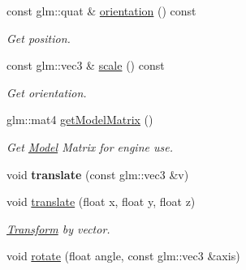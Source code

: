 \begin{DoxyCompactItemize}
\item 
\hypertarget{class_transform_component_a97463125a89912585d1facfc5e383765}{const glm\+::quat \& \hyperlink{class_transform_component_a97463125a89912585d1facfc5e383765}{orientation} () const }\label{class_transform_component_a97463125a89912585d1facfc5e383765}

\begin{DoxyCompactList}\small\item\em Get position. \end{DoxyCompactList}\item 
\hypertarget{class_transform_component_a759c702f0602108614a0a00503c2320a}{const glm\+::vec3 \& \hyperlink{class_transform_component_a759c702f0602108614a0a00503c2320a}{scale} () const }\label{class_transform_component_a759c702f0602108614a0a00503c2320a}

\begin{DoxyCompactList}\small\item\em Get orientation. \end{DoxyCompactList}\item 
glm\+::mat4 \hyperlink{class_transform_component_a5fc531fdaba497dfb2013edce34cb094}{get\+Model\+Matrix} ()
\begin{DoxyCompactList}\small\item\em Get \hyperlink{class_model}{Model} Matrix for engine use. \end{DoxyCompactList}\item 
\hypertarget{class_transform_component_af6ff15b431e0959b26714037f4b5e5e9}{void {\bfseries translate} (const glm\+::vec3 \&v)}\label{class_transform_component_af6ff15b431e0959b26714037f4b5e5e9}

\item 
\hypertarget{class_transform_component_af495b5a63ba61ac9f67170ecf30769ac}{void \hyperlink{class_transform_component_af495b5a63ba61ac9f67170ecf30769ac}{translate} (float x, float y, float z)}\label{class_transform_component_af495b5a63ba61ac9f67170ecf30769ac}

\begin{DoxyCompactList}\small\item\em \hyperlink{class_transform}{Transform} by vector. \end{DoxyCompactList}\item 
\hypertarget{class_transform_component_a54f3f0e7924028bb32279aac3938a149}{void \hyperlink{class_transform_component_a54f3f0e7924028bb32279aac3938a149}{rotate} (float angle, const glm\+::vec3 \&axis)}\label{class_transform_component_a54f3f0e7924028bb32279aac3938a149}


\end{DoxyCompactItemize}
